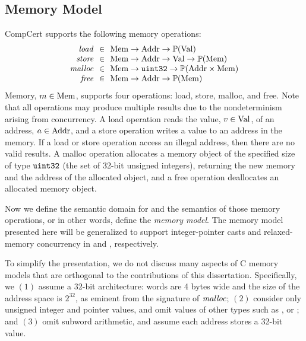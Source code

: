 

\subsection{Memory Model}
\label{sec:background:memory}


CompCert supports the following memory operations:
\[
\begin{array}{r@{~~}c@{~~}l}
  \memLoad &\in& \rtlMem \to \rtlAddr \to \powset{\rtlVal} \\
  \memStore &\in& \rtlMem \to \rtlAddr \to \rtlVal \to \powset{\rtlMem} \\
  \memMalloc &\in& \rtlMem \to \usize \to \powset{\rtlAddr \times \rtlMem} \\
  \memFree &\in& \rtlMem \to \rtlAddr \to \powset{\rtlMem} \\
\end{array}
\]
%
\noindent Memory, $m\in\mathrm{Mem}$, supports four operations: load, store, malloc, and free.  Note that
all operations may produce multiple results due to the nondeterminism arising from \eg{}
concurrency.  A load operation reads the value, $v\in\mathrm{Val}$, of an address, $a\in\mathrm{Addr}$, and a
store operation writes a value to an address in the memory.  If a load or store operation access an
illegal address, then there are no valid results.  A malloc operation allocates a memory object of
the specified size of type $\mathtt{uint32}$ (the set of 32-bit unsigned integers), returning the new memory
and the address of the allocated object, and a free operation deallocates an allocated memory
object.

Now we define the semantic domain for and the semantics of those memory operations, or in other
words, define the \emph{memory model}.  The memory model presented here will be generalized to
support integer-pointer casts and relaxed-memory concurrency in  and
, respectively.

To simplify the presentation, we do not discuss many aspects of C memory models that are orthogonal
to the contributions of this dissertation.  Specifically, we $(1)$ assume a 32-bit architecture:
words are 4 bytes wide and the size of the address space is $2^{32}$, as eminent from the signature
of $\mathit{malloc}$; $(2)$ consider only unsigned integer and pointer values, and omit values of other
types such as \isize,  or ; and $(3)$ omit subword arithmetic, and assume
each address stores a 32-bit value.

